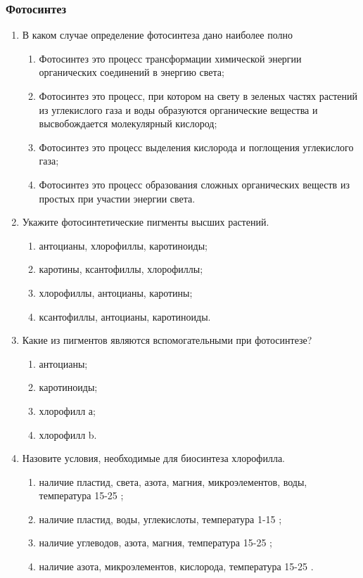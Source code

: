 \subsubsection*{Фотосинтез}

\begin{enumerate}

\item В каком случае определение фотосинтеза дано наиболее полно
\begin{enumerate}
	\item Фотосинтез это процесс трансформации химической энергии органических соединений в энергию света; 
	\item Фотосинтез это процесс, при котором на свету в зеленых частях растений из углекислого газа и воды образуются органические вещества и высвобождается молекулярный кислород; 
	\item Фотосинтез это процесс выделения кислорода и поглощения углекислого газа; 
	\item Фотосинтез это процесс образования сложных органических веществ из простых при участии энергии света.
\end{enumerate}

\item Укажите фотосинтетические пигменты высших растений.
\begin{enumerate}
	\item антоцианы, хлорофиллы, каротиноиды; 
	\item каротины, ксантофиллы, хлорофиллы; 
	\item хлорофиллы,  антоцианы, каротины; 
	\item ксантофиллы, антоцианы, каротиноиды.
\end{enumerate}

\item Какие из пигментов являются вспомогательными при фотосинтезе?
\begin{enumerate}
	\item антоцианы; 
	\item каротиноиды; 
	\item хлорофилл а; 
	\item хлорофилл b.
\end{enumerate}

\item Назовите условия, необходимые для биосинтеза хлорофилла.
\begin{enumerate}
	\item наличие пластид, света, азота, магния, микроэлементов, воды, температура 15-25 \celsius; 
	\item наличие пластид, воды, углекислоты, температура 1-15 \celsius; 
	\item наличие углеводов, азота, магния, температура 15-25 \celsius; 
	\item наличие азота, микроэлементов, кислорода, температура 15-25 \celsius. 
\end{enumerate}


\end{enumerate}
